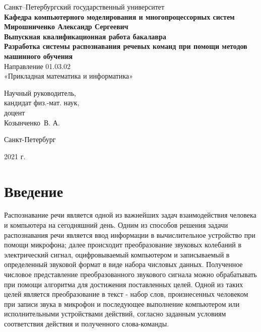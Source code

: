 \documentclass[14pt]{article}
\begin{document}
\begin{titlepage}
\begin{center}
Санкт--Петербургский государственный университет \\
\textbf{Кафедра компьютерного моделирования и многопроцессорных систем}
\vspace{55mm} \\
\textbf{\large Мирошниченко Александр Сергеевич} \\[10mm]
\textbf{\large Выпускная квалификационная работа бакалавра} \\[10mm]
\textbf{\large Разработка системы распознавания речевых команд при помощи методов машинного обучения} \\
Направление 01.03.02 \\
«Прикладная математика и информатика»\\[30mm]
\begin{flushright}
{Научный руководитель,} \\
кандидат физ.-мат. наук, \\доцент \\Козынченко~В. А. 
\end{flushright}
\vfill 
{Санкт-Петербург}
\par{2021 г.}
\end{center}
\end{titlepage}
\addtocounter{page}{1}

\tableofcontents
\newpage

\section*{Введение}
Распознавание речи является одной из важнейших задач взаимодействия человека и компьютера на сегодняшний день. Одним из способов решения задачи распознавания речи является ввод информации в вычислительное устройство при помощи микрофона; далее происходит преобразование звуковых колебаний в электрический сигнал, оцифровываемый компьютером и записываемый в определенный звуковой формат в виде набора числовых данных. Полученное числовое представление преобразованного звукового сигнала можно обрабатывать при помощи алгоритма для достижения поставленных целей. Одной из таких целей является преобразование в текст - набор слов, произнесенных человеком при записи звука в микрофон и последующее выполнение компьютером или исполнительными устройствами действий, согласно заданным условиям соответствия действия и полученного слова-команды.
\end{document}

